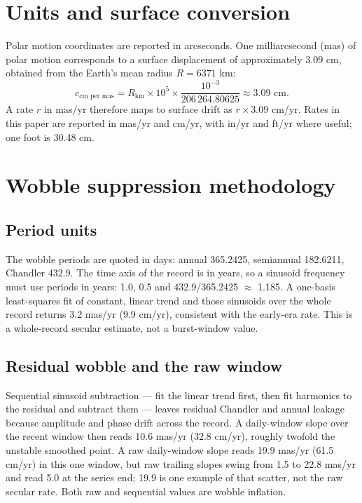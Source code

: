 \documentclass[11pt,a4paper]{article}
\begin{document}
\section{Units and surface conversion}

Polar motion coordinates are reported in arcseconds. One milliarcsecond (mas) of polar motion corresponds to a surface displacement of approximately 3.09 cm, obtained from the Earth's mean radius $R = 6371$ km:
\begin{equation}
c_{\text{cm per mas}} = R_{\text{km}} \times 10^{5} \times \frac{10^{-3}}{206\,264.80625} \approx 3.09 \text{ cm}.
\end{equation}
A rate $r$ in mas/yr therefore maps to surface drift as $r \times 3.09$ cm/yr. Rates in this paper are reported in mas/yr and cm/yr, with in/yr and ft/yr where useful; one foot is 30.48 cm.

\section{Wobble suppression methodology}

\subsection{Period units}

The wobble periods are quoted in days: annual 365.2425, semiannual 182.6211, Chandler 432.9. The time axis of the record is in years, so a sinusoid frequency must use periods in years: 1.0, 0.5 and 432.9/365.2425 $\approx$ 1.185. A one-basis least-squares fit of constant, linear trend and those sinusoids over the whole record returns 3.2 mas/yr (9.9 cm/yr), consistent with the early-era rate. This is a whole-record secular estimate, not a burst-window value.

\subsection{Residual wobble and the raw window}

Sequential sinusoid subtraction --- fit the linear trend first, then fit harmonics to the residual and subtract them --- leaves residual Chandler and annual leakage because amplitude and phase drift across the record. A daily-window slope over the recent window then reads 10.6 mas/yr (32.8 cm/yr), roughly twofold the unstable smoothed point. A raw daily-window slope reads 19.9 mas/yr (61.5 cm/yr) in this one window, but raw trailing slopes swing from 1.5 to 22.8 mas/yr and read 5.0 at the series end; 19.9 is one example of that scatter, not the raw secular rate. Both raw and sequential values are wobble inflation.
\end{document}

